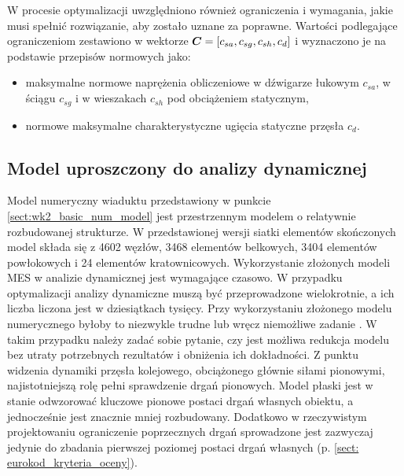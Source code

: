 W procesie optymalizacji uwzględniono również ograniczenia i wymagania, jakie musi spełnić rozwiązanie, aby zostało uznane za poprawne. Wartości podlegające ograniczeniom zestawiono w wektorze $\bm{C}=[c_{sa},c_{sg},c_{sh},c_{d}]$ i wyznaczono je na podstawie przepisów normowych \parencite{PKNc,PKNj} jako:
\begin{itemize}
	\item maksymalne normowe naprężenia obliczeniowe w dźwigarze łukowym $c_{sa}$, w ściągu $c_{sg}$ i w wieszakach $c_{sh}$ pod obciążeniem statycznym,
	\item normowe maksymalne charakterystyczne ugięcia statyczne przęsła $c_{d}$.
\end{itemize}
\subsection{Model uproszczony do analizy dynamicznej}

Model numeryczny wiaduktu przedstawiony w punkcie \ref{sect:wk2_basic_num_model} jest przestrzennym modelem o relatywnie rozbudowanej strukturze. W przedstawionej wersji siatki elementów skończonych model składa się z 4602 węzłów, 3468 elementów belkowych, 3404 elementów powłokowych i 24 elementów kratownicowych. Wykorzystanie złożonych modeli MES w analizie dynamicznej jest wymagające czasowo. W przypadku optymalizacji analizy dynamiczne muszą być przeprowadzone wielokrotnie, a ich liczba liczona jest w dziesiątkach tysięcy. Przy wykorzystaniu złożonego modelu numerycznego byłoby to niezwykle trudne lub wręcz niemożliwe zadanie \parencite{Zotowski2017c}. W takim przypadku należy zadać sobie pytanie, czy jest możliwa redukcja modelu bez utraty potrzebnych rezultatów i obniżenia ich dokładności. Z punktu widzenia dynamiki przęsła kolejowego, obciążonego głównie siłami pionowymi, najistotniejszą rolę pełni sprawdzenie drgań pionowych. Model płaski jest w stanie odwzorować kluczowe pionowe postaci drgań własnych obiektu, a jednocześnie jest znacznie mniej rozbudowany. Dodatkowo w rzeczywistym projektowaniu ograniczenie poprzecznych drgań sprowadzone jest zazwyczaj jedynie do zbadania pierwszej poziomej postaci drgań własnych (p. \ref{sect: eurokod_kryteria_oceny}).  



